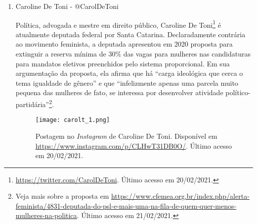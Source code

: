\documentclass[
	12pt,				%
	openright,			%
	twoside,			%
	a4paper,			%
	english,			%
	brazil				%
	]{abntex2}
\begin{document}
\begin{anexosenv}
\begin{enumerate}
 
 \begin{figure}[!htbp]
    \centering
    \texttt{[image: cneto\_2.png]}
    \caption{Postagem no Twitter de Carmelo Neto. Disponível em \url{https://twitter.com/carmelonetobr/status/1254203047468818434}. Último acesso em 20/02/2021.}
 \end{figure}
  

  \item Caroline De Toni - @CarolDeToni
  
  Política, advogada e mestre em direito público, Caroline De Toni\footnote{\url{https://twitter.com/CarolDeToni}. Último acesso em 20/02/2021.} é atualmente deputada federal por Santa Catarina. Declaradamente contrária ao movimento feminista, a deputada apresentou em 2020 proposta para extinguir a reserva mínima de $30\%$ das vagas para mulheres nas candidaturas para mandatos eletivos preenchidos pelo sistema proporcional. Em sua argumentação da proposta, ela afirma que há ``carga ideológica que cerca o tema igualdade de gênero'' e que ``infelizmente apenas uma parcela muito pequena das mulheres de fato, se interessa por desenvolver atividade político-partidária''\footnote{Veja mais sobre a proposta em \url{https://www.cfemea.org.br/index.php/alerta-feminista/4831-deputada-do-psl-e-mais-uma-na-fila-de-quem-quer-menos-mulheres-na-politica}. Último acesso em 21/02/2021.}.
 
 \begin{figure}[!htbp]
    \centering
    \texttt{[image: carolt\_1.png]}
    \caption{Postagem no \textit{Instagram} de Caroline De Toni. Disponível em \url{https://www.instagram.com/p/CLHwT31DB0O/}. Último acesso em 20/02/2021.}
 \end{figure}
 
 
 

\end{enumerate}
\end{anexosenv}
\end{document}
